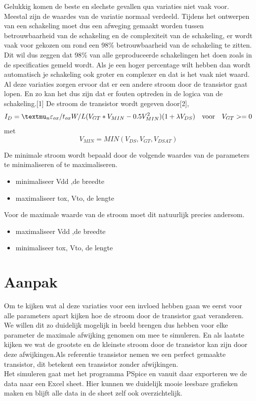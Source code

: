 \documentclass{article}
\begin{document}
Gelukkig komen de beste en slechste gevallen qua variaties niet vaak voor. Meestal zijn de waardes van de variatie normaal verdeeld. 
Tijdens het ontwerpen van een schakeling moet dus een afweging gemaakt worden tussen betrouwbaarheid van de schakeling en de complexiteit van de schakeling, er wordt vaak voor gekozen om rond een 98\% betrouwbaarheid van de schakeling te zitten. Dit wil dus zeggen dat 98\% van alle geproduceerde schakelingen het doen zoals in de specificaties gemeld wordt. Als je een hoger percentage wilt hebben dan wordt automatisch je schakeling ook groter en complexer en dat is het vaak niet waard.\\
Al deze variaties zorgen ervoor dat er een andere stroom door de transistor gaat lopen. En zo kan het dus zijn dat er fouten optreden in de logica van de schakeling.[1] De stroom de transistor wordt gegeven door[2],
\newline
\begin {equation}
	I_D = \textmu _{n}\varepsilon _{ox}/t_{ox}W/L(V_{GT}*V_{MIN} - 0.5V_{MIN}^2)(1+\lambda V_{DS})    \mathrm{~~~voor~~~}    V_{GT}>= 0
\end {equation}
 met 
\begin {equation}
	V_{MIN} = MIN(V_{DS},V_{GT},V_{DSAT})
\end {equation}

De minimale stroom wordt bepaald door de volgende waardes van de  parameters te minimaliseren of te maximaliseren.
\begin{itemize}
	\item minimaliseer Vdd ,de breedte
	\item maximaliseer tox, Vto, de lengte
\end{itemize}

Voor de maximale waarde van de stroom moet dit natuurlijk precies andersom.

\begin{itemize}
	\item maximaliseer Vdd ,de breedte
	\item  minimaliseer tox, Vto, de lengte
\end{itemize}


\section{Aanpak}

Om te kijken wat al deze variaties voor een invloed hebben gaan we eerst voor alle parameters apart kijken hoe de stroom door de transistor gaat veranderen. We willen dit zo duidelijk mogelijk in beeld brengen dus hebben voor elke parameter de maximale afwijking genomen om mee te simuleren. En als laatste kijken we wat de grootste en de kleinste stroom door de transistor kan zijn door deze afwijkingen.Als referentie transistor nemen we een perfect gemaakte transistor, dit betekent een transistor zonder afwijkingen.\\
Het simuleren gaat met het programma PSpice en vanuit daar exporteren we de data naar een Excel sheet. Hier kunnen we duidelijk mooie leesbare grafieken maken en blijft alle data in de sheet zelf ook overzichtelijk.
\end{document}
